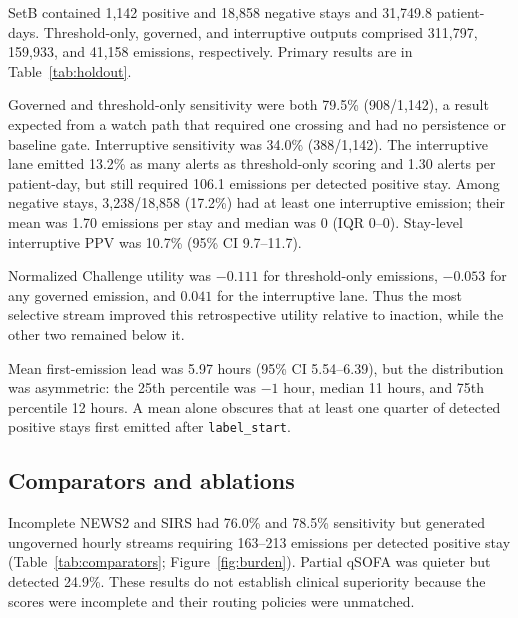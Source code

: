 \documentclass[11pt]{article}
\begin{document}
SetB contained 1,142 positive and 18,858 negative stays and 31,749.8
patient-days. Threshold-only, governed, and interruptive outputs comprised
311,797, 159,933, and 41,158 emissions, respectively. Primary results are in
Table~\ref{tab:holdout}.

\begin{table}[htbp]
\centering\footnotesize
\caption{Primary setB holdout results under the prespecified $-12/+6$-hour
window. CI, confidence interval; PPV, positive predictive value; N/G/I,
threshold-only naive/governed/interruptive.}
\label{tab:holdout}
\end{table}

Governed and threshold-only sensitivity were both 79.5\% (908/1,142), a result
expected from a watch path that required one crossing and had no persistence or
baseline gate. Interruptive sensitivity was 34.0\% (388/1,142). The interruptive
lane emitted 13.2\% as many alerts as threshold-only scoring and 1.30 alerts per
patient-day, but still required 106.1 emissions per detected positive stay.
Among negative stays, 3,238/18,858 (17.2\%) had at least one interruptive
emission; their mean was 1.70 emissions per stay and median was 0 (IQR 0--0).
Stay-level interruptive PPV was 10.7\% (95\% CI 9.7--11.7).

Normalized Challenge utility was $-0.111$ for threshold-only emissions,
$-0.053$ for any governed emission, and $0.041$ for the interruptive lane. Thus
the most selective stream improved this retrospective utility relative to
inaction, while the other two remained below it.

Mean first-emission lead was 5.97 hours (95\% CI 5.54--6.39), but the distribution
was asymmetric: the 25th percentile was $-1$ hour, median 11 hours, and 75th
percentile 12 hours. A mean alone obscures that at least one quarter of detected
positive stays first emitted after \texttt{label\_start}.

\subsection{Comparators and ablations}
Incomplete NEWS2 and SIRS had 76.0\% and 78.5\% sensitivity but generated
ungoverned hourly streams requiring 163--213 emissions per detected positive
stay (Table~\ref{tab:comparators}; Figure~\ref{fig:burden}). Partial qSOFA was
quieter but detected 24.9\%. These results do not establish clinical superiority
because the scores were incomplete and their routing policies were unmatched.
\end{document}
